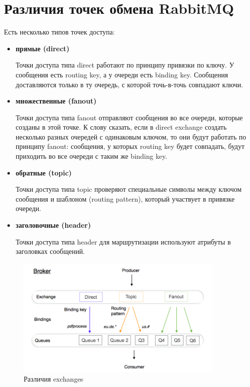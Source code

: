 \section{Различия точек обмена RabbitMQ}

Есть несколько типов точек доступа:

\begin{itemize}
\item \textbf{прямые (direct)}

Точки доступа типа direct работают по принципу привязки по ключу. У сообщения есть routing key, а у очереди есть binding key. Сообщения доставляются только в ту очередь, с которой точь-в-точь совпадают ключи.
\item \textbf{множественные (fanout)}

Точки доступа типа fanout отправляют сообщения во все очереди, которые созданы в этой точке. К слову сказать, если в direct exchange создать несколько разных очередей с одинаковым ключом, то они будут работать по принципу fanout: сообщения, у которых routing key будет совпадать, будут приходить во все очереди с таким же binding key.
\item \textbf{обратные (topic)}

Точки доступа типа topic проверяют специальные символы между ключом сообщения и шаблоном (routing pattern), который участвует в привязке очереди.
\item \textbf{заголовочные (header)}

Точки доступа типа header для маршрутизации используют атрибуты в заголовках сообщений.
\end{itemize}

\begin{figure}[h!]
\centering
\includegraphics[width=0.9\textwidth]{img/exchanges.png}
\caption{Различия exchanges}
\label{fig6}
\end{figure}

